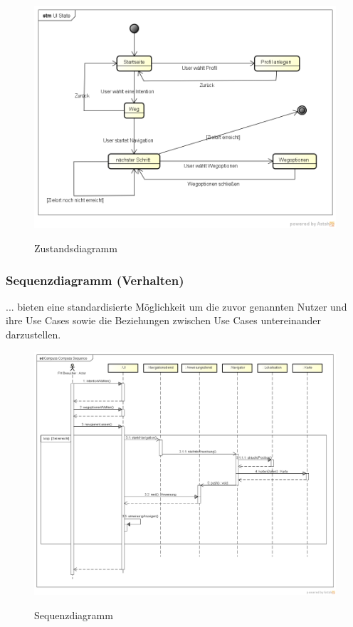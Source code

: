 \begin{figure}[hbt]
  \centering
  \includegraphics[width=\linewidth]{img/zustandsdiagramm.png}
  \label{img:zustandsdiagramm}
  \caption{Zustandsdiagramm}
\end{figure}

\subsubsection*{Sequenzdiagramm (Verhalten)}
... bieten eine standardisierte Möglichkeit um die zuvor genannten Nutzer und ihre Use Cases sowie die Beziehungen zwischen Use Cases untereinander darzustellen.

\begin{figure}[hbt]
  \centering
  \includegraphics[width=\linewidth]{img/sequenzdiagramm.png}
  \label{img:sequenzdiagramm}
  \caption{Sequenzdiagramm}
\end{figure}